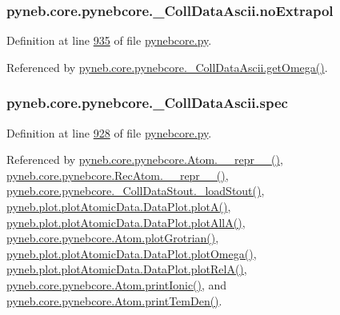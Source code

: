 \hypertarget{classpyneb_1_1core_1_1pynebcore_1_1___coll_data_ascii_aa4f6c8d0a2a8e4ac6503d67b4a51188d}{
\subsubsection[{no\-Extrapol}]{\setlength{\rightskip}{0pt plus 5cm}pyneb.\-core.\-pynebcore.\-\_\-\-Coll\-Data\-Ascii.\-no\-Extrapol}}\label{classpyneb_1_1core_1_1pynebcore_1_1___coll_data_ascii_aa4f6c8d0a2a8e4ac6503d67b4a51188d}


Definition at line \hyperlink{pynebcore_8py_source_l00935}{935} of file \hyperlink{pynebcore_8py_source}{pynebcore.\-py}.



Referenced by \hyperlink{pynebcore_8py_source_l01082}{pyneb.\-core.\-pynebcore.\-\_\-\-Coll\-Data\-Ascii.\-get\-Omega()}.

\hypertarget{classpyneb_1_1core_1_1pynebcore_1_1___coll_data_ascii_a75f41e91e7eb224162912bedac22b342}{
\subsubsection[{spec}]{\setlength{\rightskip}{0pt plus 5cm}pyneb.\-core.\-pynebcore.\-\_\-\-Coll\-Data\-Ascii.\-spec}}\label{classpyneb_1_1core_1_1pynebcore_1_1___coll_data_ascii_a75f41e91e7eb224162912bedac22b342}


Definition at line \hyperlink{pynebcore_8py_source_l00928}{928} of file \hyperlink{pynebcore_8py_source}{pynebcore.\-py}.



Referenced by \hyperlink{pynebcore_8py_source_l02615}{pyneb.\-core.\-pynebcore.\-Atom.\-\_\-\-\_\-repr\-\_\-\-\_\-()}, \hyperlink{pynebcore_8py_source_l03154}{pyneb.\-core.\-pynebcore.\-Rec\-Atom.\-\_\-\-\_\-repr\-\_\-\-\_\-()}, \hyperlink{pynebcore_8py_source_l01178}{pyneb.\-core.\-pynebcore.\-\_\-\-Coll\-Data\-Stout.\-\_\-load\-Stout()}, \hyperlink{plot_atomic_data_8py_source_l00117}{pyneb.\-plot.\-plot\-Atomic\-Data.\-Data\-Plot.\-plot\-A()}, \hyperlink{plot_atomic_data_8py_source_l00189}{pyneb.\-plot.\-plot\-Atomic\-Data.\-Data\-Plot.\-plot\-All\-A()}, \hyperlink{pynebcore_8py_source_l02443}{pyneb.\-core.\-pynebcore.\-Atom.\-plot\-Grotrian()}, \hyperlink{plot_atomic_data_8py_source_l00373}{pyneb.\-plot.\-plot\-Atomic\-Data.\-Data\-Plot.\-plot\-Omega()}, \hyperlink{plot_atomic_data_8py_source_l00262}{pyneb.\-plot.\-plot\-Atomic\-Data.\-Data\-Plot.\-plot\-Rel\-A()}, \hyperlink{pynebcore_8py_source_l02233}{pyneb.\-core.\-pynebcore.\-Atom.\-print\-Ionic()}, and \hyperlink{pynebcore_8py_source_l02324}{pyneb.\-core.\-pynebcore.\-Atom.\-print\-Tem\-Den()}.

